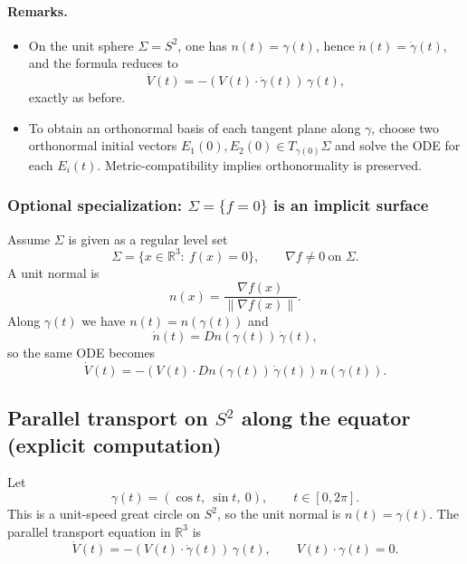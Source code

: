 \documentclass[12pt,a4paper]{article}
\theoremstyle{plain}
\theoremstyle{definition}      %
\begin{document}
	\paragraph{Remarks.}
	\begin{itemize}
		\item On the unit sphere $\Sigma=S^2$, one has $n(t)=\gamma(t)$, hence $\dot n(t)=\dot\gamma(t)$, and the formula reduces to
		\[
		\dot V(t)=-(V(t)\cdot \dot\gamma(t))\,\gamma(t),
		\]
		exactly as before.
		\item To obtain an orthonormal basis of each tangent plane along $\gamma$, choose two orthonormal initial vectors
		$E_1(0),E_2(0)\in T_{\gamma(0)}\Sigma$ and solve the ODE for each $E_i(t)$.
		Metric-compatibility implies orthonormality is preserved.
	\end{itemize}
	
	
	\subsubsection*{Optional specialization: $\Sigma=\{f=0\}$ is an implicit surface}
	
	Assume $\Sigma$ is given as a regular level set
	\[
	\Sigma=\{x\in\mathbb{R}^3:\ f(x)=0\},\qquad \nabla f\neq 0\ \text{on }\Sigma.
	\]
	A unit normal is
	\[
	n(x)=\frac{\nabla f(x)}{\|\nabla f(x)\|}.
	\]
	Along $\gamma(t)$ we have $n(t)=n(\gamma(t))$ and
	\[
	\dot n(t)=Dn(\gamma(t))\,\dot\gamma(t),
	\]
	so the same ODE becomes
	\[
	\dot V(t)=-(V(t)\cdot Dn(\gamma(t))\,\dot\gamma(t))\,n(\gamma(t)).
	\]
	


\subsection*{Parallel transport on $S^2$ along the equator (explicit computation)}

Let
\[
\gamma(t)=(\cos t,\ \sin t,\ 0),\qquad t\in[0,2\pi].
\]
This is a unit-speed great circle on $S^2$, so the unit normal is $n(t)=\gamma(t)$.
The parallel transport equation in $\mathbb{R}^3$ is
\[
\dot V(t)=-(V(t)\cdot \dot\gamma(t))\,\gamma(t),
\qquad V(t)\cdot \gamma(t)=0.
\]
\end{document}
